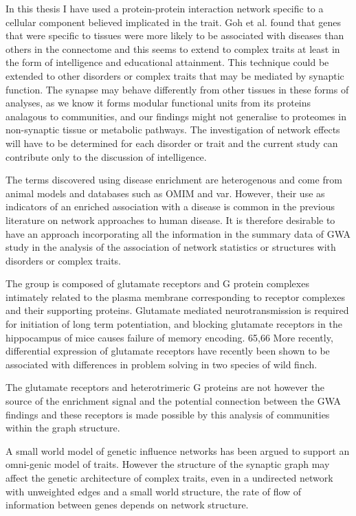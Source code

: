 In this thesis I have used a protein-protein interaction network specific to a cellular component believed implicated in the trait. Goh et al. found that genes that were specific to tissues were more likely to be associated with diseases than others in the connectome \cite{goh2007human} and this seems to extend to complex traits at least in the form of intelligence and educational attainment. This technique could be extended to other disorders or complex traits that may be mediated by synaptic function. The synapse may behave differently from other tissues in these forms of analyses, as we know it forms modular functional units from its proteins analagous to communities\cite{grant2012synaptopathies}, and our findings might not generalise to proteomes in non-synaptic tissue or metabolic pathways. The investigation of network effects will have to be determined for each disorder or trait and the current study can contribute only to the discussion of intelligence. 



 
 	
 The terms discovered using disease enrichment are heterogenous and come from animal models and databases such as OMIM and var. However, their use as indicators of an enriched association with a disease is common in the previous literature on network approaches to human disease. It is therefore desirable to have an approach incorporating all the information in the summary data of GWA study in the analysis of the association of network statistics or structures with disorders or complex traits.
 
The group is composed of glutamate receptors and G protein complexes intimately related to the plasma membrane corresponding to receptor complexes and their supporting proteins. Glutamate mediated neurotransmission is required for initiation of long term potentiation, and blocking glutamate receptors in the hippocampus of mice causes failure of memory encoding. 65,66  More recently, differential expression of glutamate receptors have recently been shown to be associated with differences in problem solving in two species of wild finch. \cite{audet2018divergence}  

The glutamate receptors and heterotrimeric G proteins are not however the source of the enrichment signal and the potential connection between the GWA findings and these receptors is made possible by this analysis of communities within the graph structure.

A small world model of genetic influence networks has been argued to support an omni-genic model of traits. \cite{boyle2017expanded}  However the structure of the synaptic graph may affect the genetic architecture of complex traits, even in a undirected network with unweighted edges and a small world structure, the rate of flow of information between genes depends on network structure. 

